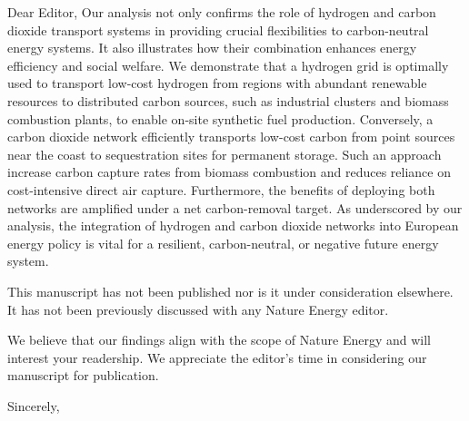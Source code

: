 \documentclass[12pt]{SHUletter}
\begin{document}
\begin{letter}{Dear Editor,}
		Our analysis not only confirms the role of hydrogen and carbon dioxide transport systems in providing crucial flexibilities to carbon-neutral energy systems. It also illustrates how their combination enhances energy efficiency and social welfare. We demonstrate that a hydrogen grid is optimally used to transport low-cost hydrogen from regions with abundant renewable resources to distributed carbon sources, such as industrial clusters and biomass combustion plants, to enable on-site synthetic fuel production. Conversely, a carbon dioxide network efficiently transports low-cost carbon from point sources near the coast to sequestration sites for permanent storage. Such an approach increase carbon capture rates from biomass combustion and reduces reliance on cost-intensive direct air capture. Furthermore, the benefits of deploying both networks are amplified under a net carbon-removal target.
		As underscored by our analysis, the integration of hydrogen and carbon dioxide networks into European energy policy is vital for a resilient, carbon-neutral, or negative future energy system.

		This manuscript has not been published nor is it under consideration elsewhere. It has not been previously discussed with any Nature Energy editor.

		We believe that our findings align with the scope of Nature Energy and will interest your readership. We appreciate the editor's time in considering our manuscript for publication.

		\closing{Sincerely,}
	\end{letter}
\end{document}

